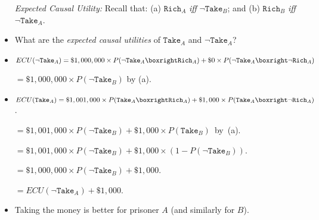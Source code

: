 \documentclass[a4paper, 11pt]{article} %
\begin{document}
\begin{itemize}
  \item[\it Expected Causal Utility:] Recall that: (a) $\texttt{Rich}_A$ \textit{iff} $\neg \texttt{Take}_B$; and (b) $\texttt{Rich}_B$ \textit{iff} $\neg \texttt{Take}_A$.
    \item What are the \textit{expected causal utilities} of $\texttt{Take}_A$ and $\neg \texttt{Take}_A$? 
    \item \mbox{$ECU(\neg \texttt{Take}_A) = \$1,000,000\times P(\neg \texttt{Take}_A \boxright \texttt{Rich}_A) + \$0\times P(\neg \texttt{Take}_A \boxright \neg \texttt{Rich}_A)$}
    \item[] \hspace{.99in} $= \$1,000,000\times P(\neg \texttt{Take}_B)$ by (a).
    \item \mbox{$ECU(\texttt{Take}_A) = \$1,001,000\times P(\texttt{Take}_A \boxright \texttt{Rich}_A) + \$1,000\times P(\texttt{Take}_A \boxright \neg \texttt{Rich}_A)$.}
    \item[] \hspace{.87in} \mbox{$= \$1,001,000\times P(\neg \texttt{Take}_B) + \$1,000\times P(\texttt{Take}_B)$ by (a).}
    \item[] \hspace{.87in} $= \$1,001,000\times P(\neg \texttt{Take}_B) + \$1,000\times (1 - P(\neg \texttt{Take}_B))$.
    \item[] \hspace{.87in} $= \$1,000,000\times P(\neg \texttt{Take}_B) + \$1,000$.
    \item[] \hspace{.87in} $= ECU(\neg \texttt{Take}_A) + \$1,000$.
    \item Taking the money is better for prisoner $A$ (and similarly for $B$).
\end{itemize}
\end{document}
